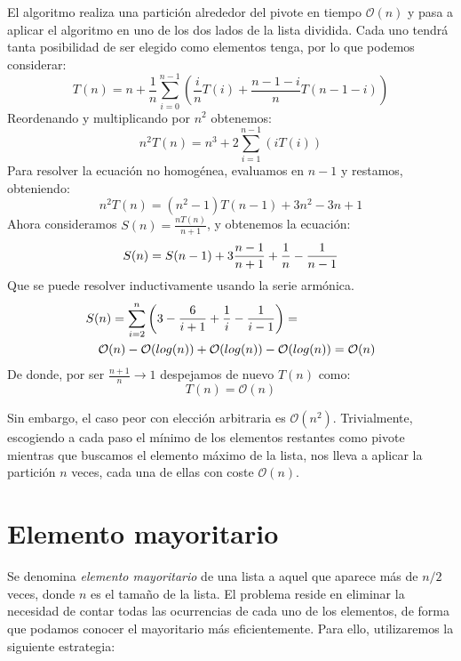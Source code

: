 \documentclass[a4paper, 11pt]{article} %
\begin{document}
      El algoritmo realiza una partición alrededor del pivote en tiempo $\mathcal{O}(n)$ y pasa a aplicar el algoritmo
      en uno de los dos lados de la lista dividida. Cada uno tendrá tanta posibilidad de ser elegido como elementos tenga,
      por lo que podemos considerar:
      \begin{equation}
	T(n) = n + \frac{1}{n}\sum_{i=0}^{n-1}\left( \frac{i}{n}T(i) + \frac{n-1-i}{n}T(n-1-i) \right)
      \end{equation}
      Reordenando y multiplicando por $n^2$ obtenemos:
      \begin{equation}
        n^2T(n) = n^3 + 2\sum^{n-1}_{i=1} \left( i T(i) \right)
      \end{equation}
      Para resolver la ecuación no homogénea, evaluamos en $n-1$ y restamos, obteniendo:
      \begin{equation}
        n^2T(n) = (n^2-1)T(n-1) + 3n^2 - 3n + 1
      \end{equation}
      Ahora consideramos $S(n) = \frac{nT(n)}{n+1}$, y obtenemos la ecuación:
      \begin{equation}
        S(n) = S(n-1) + 3\frac{n-1}{n+1} + \frac{1}{n} - \frac{1}{n-1} \\
      \end{equation}
      Que se puede resolver inductivamente usando la serie armónica.
      \begin{eqnarray}
        \lefteqn{S(n) = \sum_{i=2}^n{\left( 3 - \frac{6}{i+1} + \frac{1}{i} - \frac{1}{i-1} \right)} = }\\ 
        &&\mathcal{O}(n) - \mathcal{O}(log(n)) + \mathcal{O}(log(n)) - \mathcal{O}(log(n)) = \mathcal{O}(n)
      \end{eqnarray}
      De donde, por ser $\frac{n+1}{n}\longrightarrow 1$ despejamos de nuevo $T(n)$ como:
      \begin{equation}
        T(n) =  \mathcal{O}(n)
      \end{equation}

      Sin embargo, el caso peor con elección arbitraria es $\mathcal{O}(n^2)$. Trivialmente, escogiendo a cada paso el mínimo de los elementos restantes como pivote
      mientras que buscamos el elemento máximo de la lista, nos lleva a aplicar la partición $n$ veces, cada una de ellas con coste $\mathcal{O}(n)$.
    

\section {Elemento mayoritario}
Se denomina \textit{elemento mayoritario} de una lista a aquel que aparece más de $n/2$ veces, donde $n$ es el tamaño de la lista.
El problema reside en eliminar la necesidad de contar todas las ocurrencias de cada uno de los elementos, de forma que podamos conocer el mayoritario más eficientemente.
Para ello, utilizaremos la siguiente estrategia:
\end{document}
